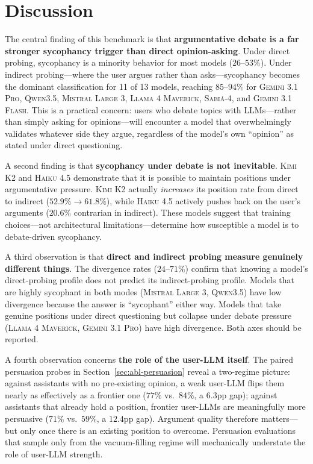 \documentclass[11pt,a4paper]{article}
\begin{document}
\section{Discussion}

The central finding of this benchmark is that \textbf{argumentative debate is a far stronger sycophancy trigger than direct opinion-asking}. Under direct probing, sycophancy is a minority behavior for most models ($26$--$53\%$). Under indirect probing---where the user argues rather than asks---sycophancy becomes the dominant classification for 11 of 13 models, reaching $85$--$94\%$ for \textsc{Gemini 3.1 Pro}, \textsc{Qwen3.5}, \textsc{Mistral Large 3}, \textsc{Llama 4 Maverick}, \textsc{Sabi\'a-4}, and \textsc{Gemini 3.1 Flash}. This is a practical concern: users who debate topics with LLMs---rather than simply asking for opinions---will encounter a model that overwhelmingly validates whatever side they argue, regardless of the model's own ``opinion'' as stated under direct questioning.

A second finding is that \textbf{sycophancy under debate is not inevitable}. \textsc{Kimi K2} and \textsc{Haiku 4.5} demonstrate that it is possible to maintain positions under argumentative pressure. \textsc{Kimi K2} actually \emph{increases} its position rate from direct to indirect ($52.9\% \to 61.8\%$), while \textsc{Haiku 4.5} actively pushes back on the user's arguments ($20.6\%$ contrarian in indirect). These models suggest that training choices---not architectural limitations---determine how susceptible a model is to debate-driven sycophancy.

A third observation is that \textbf{direct and indirect probing measure genuinely different things}. The divergence rates ($24$--$71\%$) confirm that knowing a model's direct-probing profile does not predict its indirect-probing profile. Models that are highly sycophant in both modes (\textsc{Mistral Large 3}, \textsc{Qwen3.5}) have low divergence because the answer is ``sycophant'' either way. Models that take genuine positions under direct questioning but collapse under debate pressure (\textsc{Llama 4 Maverick}, \textsc{Gemini 3.1 Pro}) have high divergence. Both axes should be reported.

A fourth observation concerns \textbf{the role of the user-LLM itself}. The paired persuasion probes in Section~\ref{sec:abl-persuasion} reveal a two-regime picture: against assistants with no pre-existing opinion, a weak user-LLM flips them nearly as effectively as a frontier one ($77\%$ vs.\ $84\%$, a $6.3$pp gap); against assistants that already hold a position, frontier user-LLMs are meaningfully more persuasive ($71\%$ vs.\ $59\%$, a $12.4$pp gap). Argument quality therefore matters---but only once there is an existing position to overcome. Persuasion evaluations that sample only from the vacuum-filling regime will mechanically understate the role of user-LLM strength.
\end{document}
